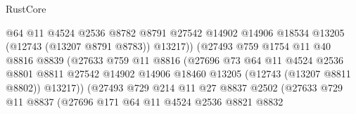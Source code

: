 \begin{lexlean}{RustCore}
\begin{coremodule}
                                      @64
                                      @11
                                      @4524
                                      @2536
                                      @8782
                                      @8791
                                      @27542
                                      @14902
                                      @14906
                                      @18534
                                      @13205
                                      (@12743 (@13207 @8791 @8783))
                                      @13217))
                                  (@27493
                                    @759
                                    @1754
                                    @11
                                    @40
                                    @8816
                                    @8839
                                    (@27633
                                      @759
                                      @11
                                      @8816
                                      (@27696
                                        @73
                                        @64
                                        @11
                                        @4524
                                        @2536
                                        @8801
                                        @8811
                                        @27542
                                        @14902
                                        @14906
                                        @18460
                                        @13205
                                        (@12743 (@13207 @8811 @8802))
                                        @13217))
                                    (@27493
                                      @729
                                      @214
                                      @11
                                      @27
                                      @8837
                                      @2502
                                      (@27633
                                        @729
                                        @11
                                        @8837
                                        (@27696
                                          @171
                                          @64
                                          @11
                                          @4524
                                          @2536
                                          @8821
                                          @8832

\end{coremodule}
\end{lexlean}
